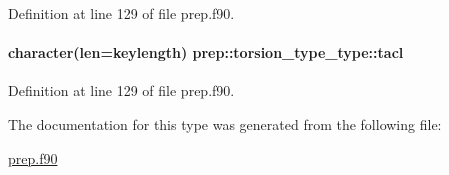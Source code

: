 Definition at line 129 of file prep.\-f90.

\hypertarget{structprep_1_1torsion__type__type_ac399c47ba9106910e6f1aedc204190dc}{
\paragraph[{tacl}]{\setlength{\rightskip}{0pt plus 5cm}character(len=keylength) prep\-::torsion\-\_\-type\-\_\-type\-::tacl}}\label{structprep_1_1torsion__type__type_ac399c47ba9106910e6f1aedc204190dc}


Definition at line 129 of file prep.\-f90.



The documentation for this type was generated from the following file\-:\begin{DoxyCompactItemize}
\item 
\hyperlink{prep_8f90}{prep.\-f90}\end{DoxyCompactItemize}
